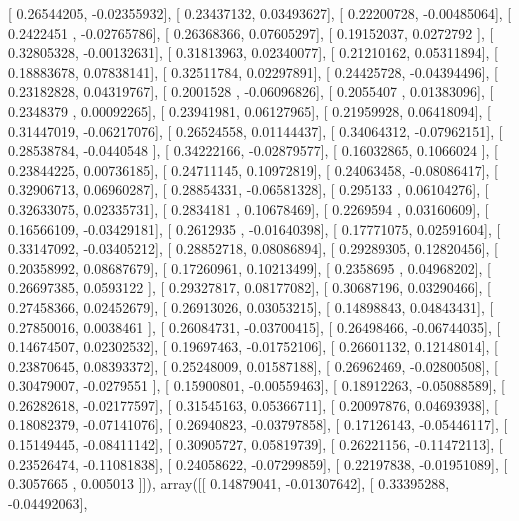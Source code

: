 \documentclass{article}
\begin{document}
       [ 0.26544205, -0.02355932],
       [ 0.23437132,  0.03493627],
       [ 0.22200728, -0.00485064],
       [ 0.2422451 , -0.02765786],
       [ 0.26368366,  0.07605297],
       [ 0.19152037,  0.0272792 ],
       [ 0.32805328, -0.00132631],
       [ 0.31813963,  0.02340077],
       [ 0.21210162,  0.05311894],
       [ 0.18883678,  0.07838141],
       [ 0.32511784,  0.02297891],
       [ 0.24425728, -0.04394496],
       [ 0.23182828,  0.04319767],
       [ 0.2001528 , -0.06096826],
       [ 0.2055407 ,  0.01383096],
       [ 0.2348379 ,  0.00092265],
       [ 0.23941981,  0.06127965],
       [ 0.21959928,  0.06418094],
       [ 0.31447019, -0.06217076],
       [ 0.26524558,  0.01144437],
       [ 0.34064312, -0.07962151],
       [ 0.28538784, -0.0440548 ],
       [ 0.34222166, -0.02879577],
       [ 0.16032865,  0.1066024 ],
       [ 0.23844225,  0.00736185],
       [ 0.24711145,  0.10972819],
       [ 0.24063458, -0.08086417],
       [ 0.32906713,  0.06960287],
       [ 0.28854331, -0.06581328],
       [ 0.295133  ,  0.06104276],
       [ 0.32633075,  0.02335731],
       [ 0.2834181 ,  0.10678469],
       [ 0.2269594 ,  0.03160609],
       [ 0.16566109, -0.03429181],
       [ 0.2612935 , -0.01640398],
       [ 0.17771075,  0.02591604],
       [ 0.33147092, -0.03405212],
       [ 0.28852718,  0.08086894],
       [ 0.29289305,  0.12820456],
       [ 0.20358992,  0.08687679],
       [ 0.17260961,  0.10213499],
       [ 0.2358695 ,  0.04968202],
       [ 0.26697385,  0.0593122 ],
       [ 0.29327817,  0.08177082],
       [ 0.30687196,  0.03290466],
       [ 0.27458366,  0.02452679],
       [ 0.26913026,  0.03053215],
       [ 0.14898843,  0.04843431],
       [ 0.27850016,  0.0038461 ],
       [ 0.26084731, -0.03700415],
       [ 0.26498466, -0.06744035],
       [ 0.14674507,  0.02302532],
       [ 0.19697463, -0.01752106],
       [ 0.26601132,  0.12148014],
       [ 0.23870645,  0.08393372],
       [ 0.25248009,  0.01587188],
       [ 0.26962469, -0.02800508],
       [ 0.30479007, -0.0279551 ],
       [ 0.15900801, -0.00559463],
       [ 0.18912263, -0.05088589],
       [ 0.26282618, -0.02177597],
       [ 0.31545163,  0.05366711],
       [ 0.20097876,  0.04693938],
       [ 0.18082379, -0.07141076],
       [ 0.26940823, -0.03797858],
       [ 0.17126143, -0.05446117],
       [ 0.15149445, -0.08411142],
       [ 0.30905727,  0.05819739],
       [ 0.26221156, -0.11472113],
       [ 0.23526474, -0.11081838],
       [ 0.24058622, -0.07299859],
       [ 0.22197838, -0.01951089],
       [ 0.3057665 ,  0.005013  ]]), array([[ 0.14879041, -0.01307642],
       [ 0.33395288, -0.04492063],
\end{document}

